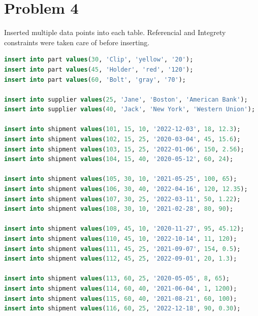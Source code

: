 \documentclass{article}
\begin{document}
\section{Problem 4}
Inserted multiple data points into each table. Referencial and Integrety constraints
were taken care of before inserting.
\begin{lstlisting}[language=sql]
insert into part values(30, 'Clip', 'yellow', '20');
insert into part values(45, 'Holder', 'red', '120');
insert into part values(60, 'Bolt', 'gray', '70');

insert into supplier values(25, 'Jane', 'Boston', 'American Bank');
insert into supplier values(40, 'Jack', 'New York', 'Western Union');

insert into shipment values(101, 15, 10, '2022-12-03', 18, 12.3);
insert into shipment values(102, 15, 25, '2020-03-04', 45, 15.6);
insert into shipment values(103, 15, 25, '2022-01-06', 150, 2.56);
insert into shipment values(104, 15, 40, '2020-05-12', 60, 24);

insert into shipment values(105, 30, 10, '2021-05-25', 100, 65);
insert into shipment values(106, 30, 40, '2022-04-16', 120, 12.35);
insert into shipment values(107, 30, 25, '2022-03-11', 50, 1.22);
insert into shipment values(108, 30, 10, '2021-02-28', 80, 90);

insert into shipment values(109, 45, 10, '2020-11-27', 95, 45.12);
insert into shipment values(110, 45, 10, '2022-10-14', 11, 120);
insert into shipment values(111, 45, 25, '2021-09-07', 154, 0.5);
insert into shipment values(112, 45, 25, '2022-09-01', 20, 1.3);

insert into shipment values(113, 60, 25, '2020-05-05', 8, 65);
insert into shipment values(114, 60, 40, '2021-06-04', 1, 1200);
insert into shipment values(115, 60, 40, '2021-08-21', 60, 100);
insert into shipment values(116, 60, 25, '2022-12-18', 90, 0.30);
\end{lstlisting}
\newpage
\end{document}
